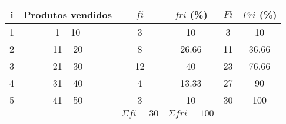 \begin{center}
	\begin{tabular}{c | c | c | c | c | c}
		\hline
		i & Produtos vendidos & $fi$              & $fri$ (\%)           & $Fi$ & $Fri$ (\%) \\
		\hline
		1 & 1 -- 10           & 3                 & 10                   & 3    & 10         \\
		\hline
		2 & 11 -- 20          & 8                 & 26.66                & 11   & 36.66      \\
		\hline
		3 & 21 -- 30          & 12                & 40                   & 23   & 76.66      \\
		\hline
		4 & 31 -- 40          & 4                 & 13.33                & 27   & 90         \\
		\hline
		5 & 41 -- 50          & 3                 & 10                   & 30   & 100        \\
		\hline
		  &                   & $\Sigma fi = 30 $ & $ \Sigma fri = 100 $ &      &
	\end{tabular}\\
\end{center}
